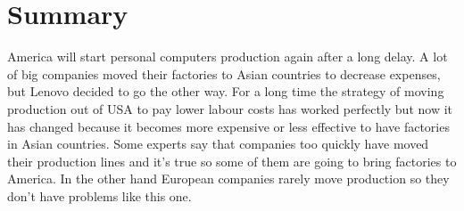 \documentclass[a4paper,12pt]{article}
\begin{document}
\section{Summary}

America will start personal computers production again after a long delay.
A lot of big companies moved their factories to Asian countries to decrease
expenses, but Lenovo decided to go the other way.
For a long time the strategy of moving production out of USA to pay lower
labour costs has worked perfectly but now it has changed because
it becomes more expensive or less effective to have factories in Asian
countries. Some experts say that companies too quickly have moved their
production lines and it's true so some of them are going to bring factories 
to America. In the other hand European companies rarely move production
so they don't have problems like this one.
\end{document}
